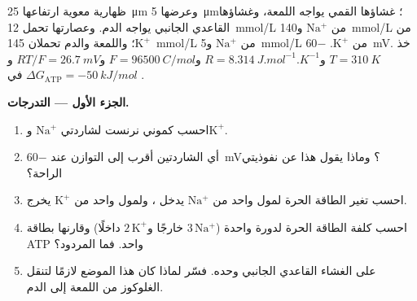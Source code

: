 \begin{problem}
\label{pb:b1:membranes-transport:1}
 ظهارية معوية ارتفاعها \qty{25}{\micro m} وعرضها
\qty{5}{\micro m}؛ غشاؤها القمي يواجه اللمعة، وغشاؤها القاعدي
الجانبي يواجه الدم. وعصارتها تحمل \qty{12}{mmol/L} من
$\mathrm{Na^+}$ و\qty{140}{mmol/L} من $\mathrm{K^+}$؛ واللمعة والدم
تحملان \qty{145}{mmol/L} من $\mathrm{Na^+}$ و\qty{5}{mmol/L} من
$\mathrm{K^+}$.  \qty{-60}{mV}. خذ $T = \qty{310}{K}$
و$R = \qty{8.314}{J.mol^{-1}.K^{-1}}$ و$F = \qty{96500}{C/mol}$
و$RT/F = \qty{26.7}{mV}$ و$\Delta G_{\text{ATP}} = \qty{-50}{kJ/mol}$
في .

\medskip
\noindent\textbf{الجزء الأول --- التدرجات.}
\begin{enumerate}
  \item احسب كموني نرنست لشاردتي $\mathrm{Na^+}$ و$\mathrm{K^+}$.
  \item أي الشاردتين أقرب إلى التوازن عند \qty{-60}{mV}؟ وماذا يقول
        هذا عن نفوذيتي الراحة؟
  \item احسب تغير الطاقة الحرة لمول واحد من $\mathrm{Na^+}$ يدخل
        ، ولمول واحد من $\mathrm{K^+}$ يخرج.
  \item احسب كلفة الطاقة الحرة لدورة  واحدة ($3\,\mathrm{Na^+}$
        خارجًا و$2\,\mathrm{K^+}$ داخلًا) وقارنها بطاقة ATP واحد. فما
        المردود؟
  \item {} على الغشاء القاعدي الجانبي وحده. فسّر لماذا كان هذا
        الموضع لازمًا لتنقل  الغلوكوز من اللمعة إلى الدم.
\end{enumerate}


\end{problem}
